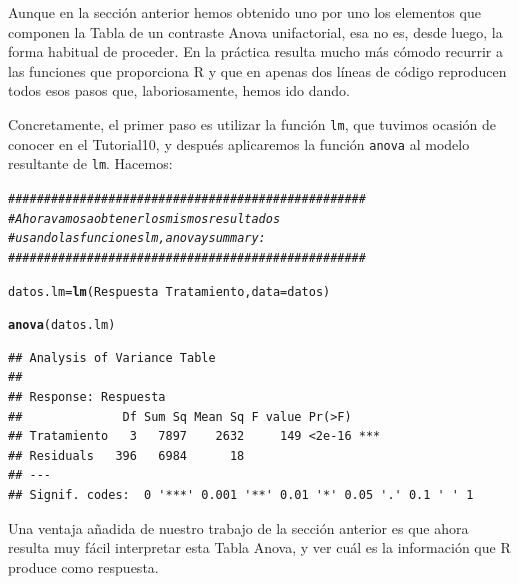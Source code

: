 \documentclass[10pt,a4paper]{article}\usepackage[]{graphicx}\usepackage[]{color}
\makeatletter
\newcommand{\hlcom}[1]{\textcolor[rgb]{0.678,0.584,0.686}{\textit{#1}}}%
\newcommand{\hlopt}[1]{\textcolor[rgb]{0,0,0}{#1}}%
\newcommand{\hlstd}[1]{\textcolor[rgb]{0.345,0.345,0.345}{#1}}%
\newcommand{\hlkwb}[1]{\textcolor[rgb]{0.69,0.353,0.396}{#1}}%
\newcommand{\hlkwc}[1]{\textcolor[rgb]{0.333,0.667,0.333}{#1}}%
\newcommand{\hlkwd}[1]{\textcolor[rgb]{0.737,0.353,0.396}{\textbf{#1}}}%
\newenvironment{kframe}{%
 \def\at@end@of@kframe{}%
 \ifinner\ifhmode%
  \def\at@end@of@kframe{\end{minipage}}%
  \begin{minipage}{\columnwidth}%
 \fi\fi%
 \def\FrameCommand##1{\hskip\@totalleftmargin \hskip-\fboxsep
 \colorbox{shadecolor}{##1}\hskip-\fboxsep
     \hskip-\linewidth \hskip-\@totalleftmargin \hskip\columnwidth}%
 \MakeFramed {\advance\hsize-\width
   \@totalleftmargin\z@ \linewidth\hsize
   \@setminipage}}%
 {\par\unskip\endMakeFramed%
 \at@end@of@kframe}
\newenvironment{knitrout}{}{} %
\newcounter {cont01}
\makeatother
\begin{document}
Aunque en la sección anterior hemos obtenido uno por uno los elementos que componen la Tabla de un contraste Anova unifactorial, esa no es, desde luego, la forma habitual de proceder. En la práctica resulta mucho más cómodo recurrir a las funciones que proporciona R y que en apenas dos líneas de código reproducen todos esos pasos que, laboriosamente, hemos ido dando.

Concretamente, el primer paso es utilizar la función {\tt lm}, que tuvimos ocasión de conocer en el Tutorial10, y después aplicaremos la función {\tt anova} al modelo resultante de {\tt lm}. Hacemos:

\begin{knitrout}
\color{fgcolor}\begin{kframe}
\begin{alltt}
\hlcom{##################################################}
\hlcom{# Ahora vamos a obtener los mismos resultados}
\hlcom{# usando las funciones lm,  anova y summary:}
\hlcom{##################################################}

\hlstd{datos.lm} \hlkwb{=} \hlkwd{lm}\hlstd{(Respuesta} \hlopt{~} \hlstd{Tratamiento,} \hlkwc{data} \hlstd{= datos)}

\hlkwd{anova}\hlstd{(datos.lm)}
\end{alltt}
\begin{verbatim}
## Analysis of Variance Table
## 
## Response: Respuesta
##              Df Sum Sq Mean Sq F value Pr(>F)    
## Tratamiento   3   7897    2632     149 <2e-16 ***
## Residuals   396   6984      18                   
## ---
## Signif. codes:  0 '***' 0.001 '**' 0.01 '*' 0.05 '.' 0.1 ' ' 1
\end{verbatim}
\end{kframe}
\end{knitrout}

Una ventaja añadida de nuestro trabajo de la sección anterior es que ahora resulta muy fácil interpretar esta Tabla Anova, y ver cuál es la información que R produce como respuesta.
\end{document}
